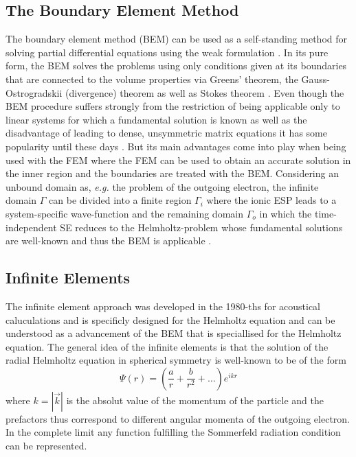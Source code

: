 \subsection{The Boundary Element Method}
The boundary element method (BEM) can be used as a self-standing method for solving partial differential equations using the weak formulation \cite{bemDai,bemCostabel}.
In its pure form, the BEM solves the problems using only conditions given at its boundaries that are connected to the volume properties via Greens' theorem, the Gauss-Ostrogradskii (divergence) theorem as well as Stokes theorem \cite{bemBook}.
Even though the BEM procedure suffers strongly from the restriction of being applicable only to linear systems for which a fundamental solution is known as well as the disadvantage of leading to dense, unsymmetric matrix equations \cite{bemCostabel} it has some popularity until these days \cite{bem1,bem2,bem3}.
But its main advantages come into play when being used with the FEM \cite{bem-fem} where the FEM can be used to obtain an accurate solution in the inner region and the boundaries are treated with the BEM.
Considering an unbound domain as, \textit{e.g.} the problem of the outgoing electron, the infinite domain $\Gamma$ can be divided into a finite region $\Gamma_i$ where the ionic ESP leads to a system-specific wave-function and the remaining domain $\Gamma_o$ in which the time-independent SE reduces to the Helmholtz-problem whose fundamental solutions are well-known and thus the BEM is applicable \cite{bemCostabel, bettessBEM}.

\subsection{Infinite Elements}
\label{ch:InfEl}
The infinite element approach was developed in the 1980-ths for acoustical caluculations and is specificly designed for the Helmholtz equation and can be understood as a advancement of the BEM that is speciallised for the Helmholtz equation.
The general idea of the infinite elements is that the solution of the radial Helmholtz equation in spherical symmetry is well-known to be of the form
\begin{equation} \label{eq:infAnsatz}
 \Psi(r) = \left(\frac ar +\frac{b}{r^2} + \hdots \right) e^{ikr}
\end{equation}
where $k=|\vec{k}|$ is the absolut value of the momentum of the particle and the prefactors thus correspond to different angular momenta of the outgoing electron.
In the complete limit any function fulfilling the Sommerfeld radiation condition \cite{sommerfeldCond} can be represented.

